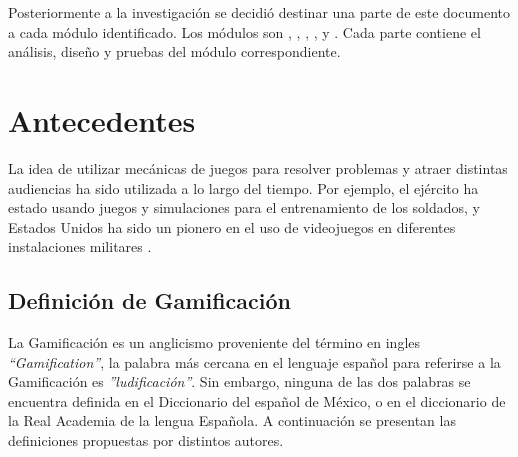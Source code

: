 \noindent Posteriormente a la investigación se decidió destinar una parte de este documento a cada módulo identificado. Los módulos son , , , ,  y . Cada parte contiene el análisis, diseño y pruebas del módulo correspondiente.\\
\clearpage



\section{Antecedentes}
\label{sec:antecedentes}

La idea de utilizar mecánicas de juegos para resolver problemas y atraer distintas audiencias ha sido utilizada a lo largo del tiempo. Por ejemplo, el ejército ha estado usando juegos y simulaciones para el entrenamiento de los soldados, y Estados Unidos ha sido un pionero en el uso de videojuegos en diferentes instalaciones militares \cite{GamByDesign}.


\subsection{Definición de Gamificación}

La Gamificación es un anglicismo proveniente del término en ingles {\it ``Gamification''}, la palabra más cercana en el lenguaje español para referirse a la Gamificación es {\it ''ludificación''}. Sin embargo, ninguna de las dos palabras se encuentra definida en el Diccionario del español de México, o en el diccionario de la Real Academia de la lengua Española. A continuación se presentan las definiciones propuestas por distintos autores.

